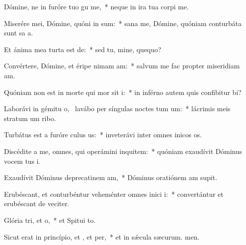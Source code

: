 \item Dómine, ne in furóre tuo gu me,~* neque in ira tua corpi me.
\item Miserére mei, Dómine, quóni in sum:~* sana me, Dómine, quóniam conturbáta sunt sa a.
\item Et ánima mea turta est de:~* sed tu, mine, quequo?
\item Convértere, Dómine, et éripe nimam am:~* salvum me fac propter miseridiam am.
\item Quóniam non est in morte qui mor sit i:~* in inférno autem quis confibitur bi?
\item Laborávi in gémitu o,~\pscross{} lavábo per síngulas noctes tum um:~* lácrimis meis stratum um ribo.
\item Turbátus est a furóre culus us:~* inveterávi inter omnes inicos os.
\item Discédite a me, omnes, qui operámini inquitem:~* quóniam exaudívit Dóminus vocem tus i.
\item Exaudívit Dóminus deprecatinem am,~* Dóminus oratiónem am supit.
\item Erubéscant, et conturbéntur veheménter omnes inici i:~* convertántur et erubéscant de veciter.
\item Glória tri, et o,~* et Spitui to.
\item Sicut erat in princípio, et , et per,~* et in sǽcula sæcurum. men.

